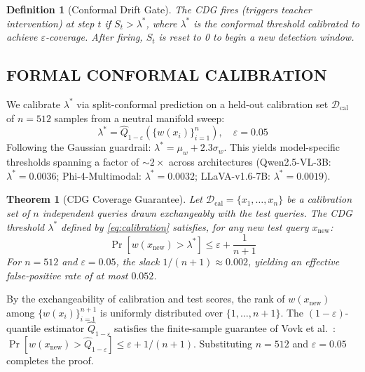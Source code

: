 \documentclass{ieeetmlcn}
\newtheorem{theorem}{Theorem}
\newtheorem{definition}{Definition}
\begin{document}
\begin{definition}[Conformal Drift Gate]
The CDG fires (triggers teacher intervention) at step $t$ if
$S_t > \lambda^*$, where $\lambda^*$ is the conformal threshold
calibrated to achieve $\varepsilon$-coverage. After firing, $S_t$ is
reset to 0 to begin a new detection window.
\end{definition}

\subsection{FORMAL CONFORMAL CALIBRATION}
We calibrate $\lambda^*$ via split-conformal prediction on a held-out
calibration set $\mathcal{D}_{\text{cal}}$ of $n=512$ samples from a
neutral manifold sweep:
\begin{equation}
  \lambda^* = \hat{Q}_{1-\varepsilon}\!\left(\{w(x_i)\}_{i=1}^n\right),
  \quad \varepsilon = 0.05
  \label{eq:calibration}
\end{equation}
Following the Gaussian guardrail: $\lambda^* = \mu_w + 2.3\sigma_w$.
This yields model-specific thresholds spanning a factor of $\sim\!2\times$
across architectures (Qwen2.5-VL-3B: $\lambda^*=0.0036$;
Phi-4-Multimodal: $\lambda^*=0.0032$; LLaVA-v1.6-7B: $\lambda^*=0.0019$).

\begin{theorem}[CDG Coverage Guarantee]
\label{thm:coverage}
Let $\mathcal{D}_{\text{cal}} = \{x_1, \ldots, x_n\}$ be a calibration set of $n$ independent queries drawn exchangeably with the test queries. The CDG threshold $\lambda^*$ defined by
\eqref{eq:calibration} satisfies, for any new test query $x_{\text{new}}$:
\begin{equation}
  \Pr\!\left[w(x_{\text{new}}) > \lambda^*\right] \leq \varepsilon +
  \frac{1}{n+1}
  \label{eq:guarantee}
\end{equation}
For $n=512$ and $\varepsilon=0.05$, the slack $1/(n+1)\approx 0.002$,
yielding an effective false-positive rate of at most $0.052$.
\end{theorem}

\begin{IEEEproof}
By the exchangeability of calibration and test scores, the rank of
$w(x_{\text{new}})$ among $\{w(x_i)\}_{i=1}^{n+1}$ is uniformly distributed
over $\{1,\ldots,n+1\}$. The $(1-\varepsilon)$-quantile estimator
$\hat{Q}_{1-\varepsilon}$ satisfies the finite-sample guarantee of Vovk
et al.\ \cite{vovk2005algorithmic}: $\Pr[w(x_{\text{new}}) > \hat{Q}_{1-\varepsilon}]
\leq \varepsilon + 1/(n+1)$. Substituting $n=512$ and $\varepsilon=0.05$
completes the proof.
\end{IEEEproof}
\end{document}
